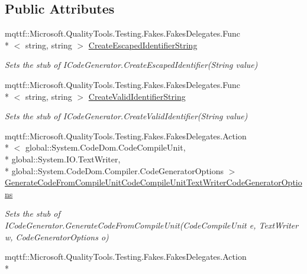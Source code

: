 \subsection*{Public Attributes}
\begin{DoxyCompactItemize}
\item 
mqttf\-::\-Microsoft.\-Quality\-Tools.\-Testing.\-Fakes.\-Fakes\-Delegates.\-Func\\*
$<$ string, string $>$ \hyperlink{class_system_1_1_code_dom_1_1_compiler_1_1_fakes_1_1_stub_i_code_generator_ae9840dc644e33cf5088174607e950126}{Create\-Escaped\-Identifier\-String}
\begin{DoxyCompactList}\small\item\em Sets the stub of I\-Code\-Generator.\-Create\-Escaped\-Identifier(\-String value)\end{DoxyCompactList}\item 
mqttf\-::\-Microsoft.\-Quality\-Tools.\-Testing.\-Fakes.\-Fakes\-Delegates.\-Func\\*
$<$ string, string $>$ \hyperlink{class_system_1_1_code_dom_1_1_compiler_1_1_fakes_1_1_stub_i_code_generator_a02c84c4b3704b5c131f12d8bf37ac973}{Create\-Valid\-Identifier\-String}
\begin{DoxyCompactList}\small\item\em Sets the stub of I\-Code\-Generator.\-Create\-Valid\-Identifier(\-String value)\end{DoxyCompactList}\item 
mqttf\-::\-Microsoft.\-Quality\-Tools.\-Testing.\-Fakes.\-Fakes\-Delegates.\-Action\\*
$<$ global\-::\-System.\-Code\-Dom.\-Code\-Compile\-Unit, \\*
global\-::\-System.\-I\-O.\-Text\-Writer, \\*
global\-::\-System.\-Code\-Dom.\-Compiler.\-Code\-Generator\-Options $>$ \hyperlink{class_system_1_1_code_dom_1_1_compiler_1_1_fakes_1_1_stub_i_code_generator_ae0be78111754b225504a2098200251c5}{Generate\-Code\-From\-Compile\-Unit\-Code\-Compile\-Unit\-Text\-Writer\-Code\-Generator\-Options}
\begin{DoxyCompactList}\small\item\em Sets the stub of I\-Code\-Generator.\-Generate\-Code\-From\-Compile\-Unit(\-Code\-Compile\-Unit e, Text\-Writer w, Code\-Generator\-Options o)\end{DoxyCompactList}\item 
mqttf\-::\-Microsoft.\-Quality\-Tools.\-Testing.\-Fakes.\-Fakes\-Delegates.\-Action\\*

\end{DoxyCompactItemize}
